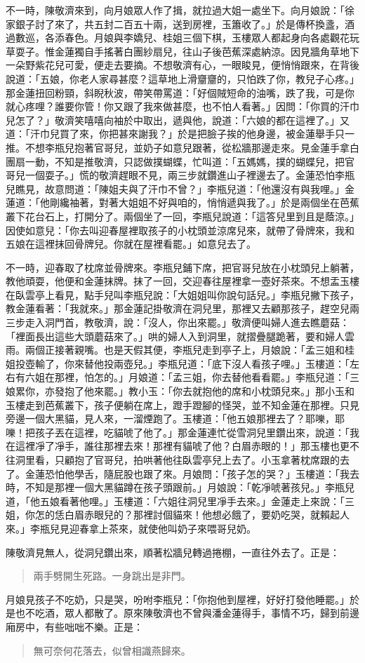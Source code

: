 不一時，陳敬濟來到，向月娘眾人作了揖，就拉過大姐一處坐下。向月娘說：「徐家銀子討了來了，共五封二百五十兩，送到房裡，玉簫收了。」於是傳杯換盞，酒過數巡，各添春色。月娘與李嬌兒、桂姐三個下棋，玉樓眾人都起身向各處觀花玩草耍子。惟金蓮獨自手搖著白團紗扇兒，往山子後芭蕉深處納涼。因見牆角草地下一朵野紫花兒可愛，便走去要摘。不想敬濟有心，一眼睃見，便悄悄跟來，在背後說道：「五娘，你老人家尋甚麼？這草地上滑齏齏的，只怕跌了你，教兒子心疼。」那金蓮扭回粉頸，斜睨秋波，帶笑帶罵道：「好個賊短命的油嘴，跌了我，可是你就心疼哩？誰要你管！你又跟了我來做甚麼，也不怕人看著。」因問：「你買的汗巾兒怎了？」敬濟笑嘻嘻向袖於中取出，遞與他，說道：「六娘的都在這裡了。」又道：「汗巾兒買了來，你把甚來謝我？」於是把臉子挨的他身邊，被金蓮舉手只一推。不想李瓶兒抱著官哥兒，並奶子如意兒跟著，從松牆那邊走來。見金蓮手拿白團扇一動，不知是推敬濟，只認做撲蝴蝶，忙叫道：「五媽媽，撲的蝴蝶兒，把官哥兒一個耍子。」慌的敬濟趕眼不見，兩三步就鑽進山子裡邊去了。金蓮恐怕李瓶兒瞧見，故意問道：「陳姐夫與了汗巾不曾？」李瓶兒道：「他還沒有與我哩。」金蓮道：「他剛纔袖著，對著大姐姐不好與咱的，悄悄遞與我了。」於是兩個坐在芭蕉叢下花台石上，打開分了。兩個坐了一回，李瓶兒說道：「這答兒里到且是蔭涼。」因使如意兒：「你去叫迎春屋裡取孩子的小枕頭並涼席兒來，就帶了骨牌來，我和五娘在這裡抹回骨牌兒。你就在屋裡看罷。」如意兒去了。

不一時，迎春取了枕席並骨牌來。李瓶兒鋪下席，把官哥兒放在小枕頭兒上躺著，教他頑耍，他便和金蓮抹牌。抹了一回，交迎春往屋裡拿一壺好茶來。不想盂玉樓在臥雲亭上看見，點手兒叫李瓶兒說：「大姐姐叫你說句話兒。」李瓶兒撇下孩子，教金蓮看著：「我就來。」那金蓮記掛敬濟在洞兒里，那裡又去顧那孩子，趕空兒兩三步走入洞門首，教敬濟，說：「沒人，你出來罷。」敬濟便叫婦人進去瞧蘑菇：「裡面長出這些大頭蘑菇來了。」哄的婦人入到洞里，就摺疊腿跪著，要和婦人雲雨。兩個正接著親嘴。也是天假其便，李瓶兒走到亭子上，月娘說：「孟三姐和桂姐投壺輸了，你來替他投兩壺兒。」李瓶兒道：「底下沒人看孩子哩。」玉樓道：「左右有六姐在那裡，怕怎的。」月娘道：「孟三姐，你去替他看看罷。」李瓶兒道：「三娘累你，亦發抱了他來罷。」教小玉：「你去就抱他的席和小枕頭兒來。」那小玉和玉樓走到芭蕉叢下，孩子便躺在席上，蹬手蹬腳的怪哭，並不知金蓮在那裡。只見旁邊一個大黑貓，見人來，一溜煙跑了。玉樓道：「他五娘那裡去了？耶嚛，耶嚛！把孩子丟在這裡，吃貓唬了他了。」那金蓮連忙從雪洞兒里鑽出來，說道：「我在這裡凈了凈手，誰往那裡去來！那裡有貓唬了他？白眉赤眼的！」那玉樓也更不往洞里看，只顧抱了官哥兒，拍哄著他往臥雲亭兒上去了。小玉拿著枕席跟的去了。金蓮恐怕他學舌，隨屁股也跟了來。月娘問：「孩子怎的哭？」玉樓道：「我去時，不知是那裡一個大黑貓蹲在孩子頭跟前。」月娘說：「乾凈唬著孩兒。」李瓶兒道，「他五娘看著他哩。」玉樓道：「六姐往洞兒里凈手去來。」金蓮走上來說：「三姐，你怎的恁白眉赤眼兒的？那裡討個貓來！他想必餓了，要奶吃哭，就賴起人來。」李瓶兒見迎春拿上茶來，就使他叫奶子來喂哥兒奶。

陳敬濟見無人，從洞兒鑽出來，順著松牆兒轉過捲棚，一直往外去了。正是：
\begin{quote}
兩手劈開生死路。一身跳出是非門。
\end{quote}

月娘見孩子不吃奶，只是哭，吩咐李瓶兒：「你抱他到屋裡，好好打發他睡罷。」於是也不吃酒，眾人都散了。原來陳敬濟也不曾與潘金蓮得手，事情不巧，歸到前邊廂房中，有些咄咄不樂。正是：
\begin{quote}
無可奈何花落去，似曾相識燕歸來。
\end{quote}
